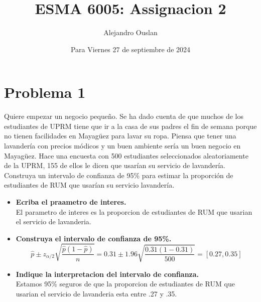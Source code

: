 \documentclass[10pt, oneside]{article}
\title{ESMA 6005: Assignacion 2}
\author{Alejandro Ouslan}
\date{Para Viernes 27 de septiembre de 2024}
\begin{document}
\maketitle

\vspace{.25in}

\section{Problema 1}
Quiere empezar un negocio pequeño. Se ha dado cuenta de que muchos de los estudiantes de
UPRM tiene que ir a la casa de sus padres el fin de semana porque no tienen facilidades en
Mayagüez para lavar su ropa. Piensa que tener una lavandería con precios módicos y un buen
ambiente sería un buen negocio en Mayagüez. Hace una encuesta con 500 estudiantes
seleccionados aleatoriamente de la UPRM, 155 de ellos le dicen que usarían su servicio de
lavandería. Construya un intervalo de confianza de 95\% para estimar la proporción de
estudiantes de RUM que usarían su servicio lavandería.

\begin{itemize}
	\item \textbf{Ecriba el praametro de interes.}\\
	      El parametro de interes es la proporcion de estudiantes de RUM que usarian el servicio de lavanderia.
	\item \textbf{Construya el intervalo de confianza de 95\%.}
	      \[
		      \hat{p} \pm z_{\alpha/2} \sqrt{\frac{\hat{p}(1-\hat{p})}{n}} = 0.31 \pm 1.96 \sqrt{\frac{0.31(1-0.31)}{500}} = [0.27,0.35]
	      \]
	\item \textbf{Indique la interpretacion del intervalo de confianza.}\\
	      Estamos 95\% seguros de que la proporcion de estudiantes de RUM que usarian el servicio de lavanderia esta entre .27 y .35.


\end{itemize}
\end{document}
